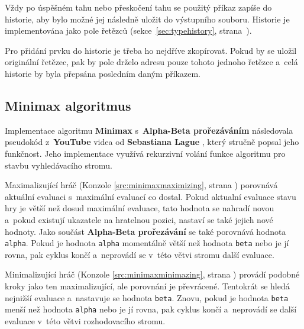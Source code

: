 Vždy po úspěšném tahu nebo přeskočení tahu se použitý příkaz zapíše do historie, aby bylo možné jej následně uložit do výstupního souboru. Historie je implementována jako pole řetězců (sekce~\ref{sec:typehistory}, strana~\pageref{sec:typehistory}).

\newpage

Pro přidání prvku do historie je třeba ho nejdříve zkopírovat. Pokud by se uložil originální řetězec, pak by pole drželo adresu pouze tohoto jednoho řetězce a~celá historie by byla přepsána posledním daným příkazem.



\subsection{Minimax algoritmus}

Implementace algoritmu \textbf{Minimax} s~\textbf{Alpha-Beta prořezáváním} následovala pseudokód z~\textbf{YouTube} videa od \textbf{Sebastiana Lague} \cite{seblag}, který stručně popsal jeho funkčnost. Jeho implementace využívá rekurzivní volání funkce algoritmu pro stavbu vyhledávacího stromu.



Maximalizující hráč (Konzole \ref{src:minimaxmaximizing}, strana \pageref{src:minimaxmaximizing}) porovnává aktuální evaluaci s~maximální evaluací co dostal. Pokud aktualní evaluace stavu hry je větší než dosud maximální evaluace, tato hodnota se nahradí novou a~pokud existují ukazatele na hratelnou pozici, nastaví se také jejich nové hodnoty. Jako součást \textbf{Alpha-Beta prořezávání} se také porovnává hodnota \lstinline{alpha}. Pokud je hodnota \lstinline{alpha} momentálně větší než hodnota \lstinline{beta} nebo je jí rovna, pak cyklus končí a~neprovádí se v~této větvi stromu další evaluace.

Minimalizující hráč (Konzole \ref{src:minimaxminimazing}, strana \pageref{src:minimaxminimazing}) provádí podobné kroky jako ten maximalizující, ale porovnání je převrácené. Tentokrát se hledá nejnižší evaluace a~nastavuje se hodnota \lstinline{beta}. Znovu, pokud je hodnota \lstinline{beta} menší než hodnota \lstinline{alpha} nebo je jí rovna, pak cyklus končí a~neprovádí se další evaluace v~této větvi rozhodovacího stromu.

